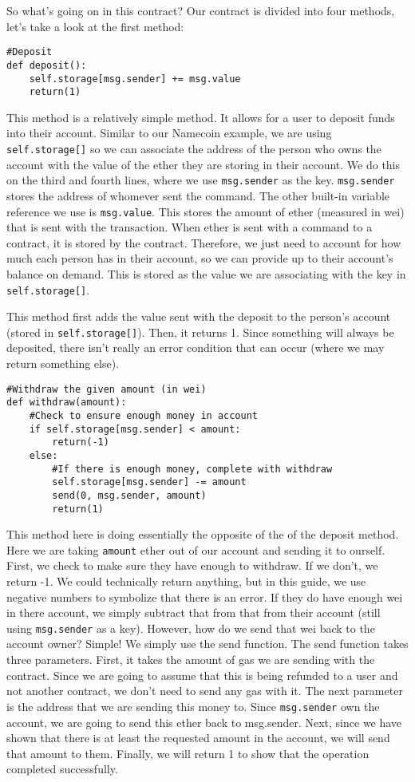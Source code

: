 \documentclass[12pt]{article}
\begin{document}
So what's going on in this contract?
Our contract is divided into four methods, let's take a look at the first method:

\begin{verbatim}
#Deposit
def deposit():
	self.storage[msg.sender] += msg.value
	return(1)
\end{verbatim}

This method is a relatively simple method. It allows for a user to deposit funds into their account. Similar to our Namecoin example, we are using \texttt{self.storage[]} so we can associate the address of the person who owns the account with the value of the ether they are storing in their account. We do this on the third and fourth lines, where we use \texttt{msg.sender} as the key. \texttt{msg.sender} stores the address of whomever sent the command. The other built-in variable reference we use is \texttt{msg.value}. This stores the amount of ether (measured in wei) that is sent with the transaction. When ether is sent with a command to a contract, it is stored by the contract. Therefore, we just need to account for how much each person has in their account, so we can provide up to their account's balance on demand. This is stored as the value we are associating with the key in \texttt{self.storage[]}.
 
This method first adds the value sent with the deposit to the person's account (stored in \texttt{self.storage[]}). Then, it returns 1. Since something will always be deposited, there isn't really an error condition that can occur (where we may return something else). 

\begin{verbatim}
#Withdraw the given amount (in wei)
def withdraw(amount):
	#Check to ensure enough money in account
	if self.storage[msg.sender] < amount:
		return(-1)
	else:
		#If there is enough money, complete with withdraw
		self.storage[msg.sender] -= amount
		send(0, msg.sender, amount)
		return(1)
\end{verbatim}

This method here is doing essentially the opposite of the of the deposit method. Here we are taking \texttt{amount} ether out of our account and sending it to ourself. First, we check to make sure they have enough to withdraw. If we don't, we return -1. We could technically return anything, but in this guide, we use negative numbers to symbolize that there is an error. If they do have enough wei in there account, we simply subtract that from that from their account (still using \texttt{msg.sender} as a key). However, how do we send that wei back to the account owner? Simple! We simply use the send function. The send function takes three parameters. First, it takes the amount of gas we are sending with the contract. Since we are going to assume that this is being refunded to a user and not another contract, we don't need to send any gas with it. The next parameter is the address that we are sending this money to. Since \texttt{msg.sender} own the account, we are going to send this ether back to msg.sender. Next, since we have shown that there is at least the requested amount in the account, we will send that amount to them. Finally, we will return 1 to show that the operation completed successfully.
\end{document}
